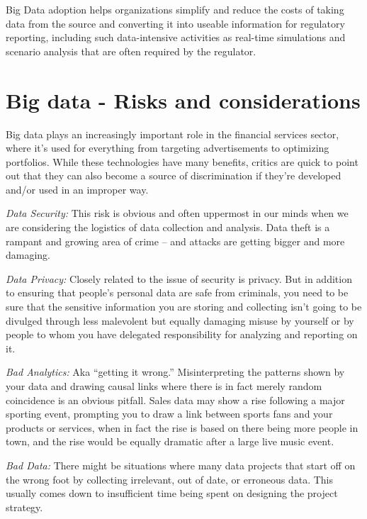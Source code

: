 \documentclass[sigconf]{acmart}
\begin{document}
Big Data adoption helps organizations
simplify and reduce the costs of taking
data from the source and converting it
into useable information for regulatory
reporting, including such data-intensive
activities as real-time simulations and
scenario analysis that are often required
by the regulator.


\section{Big data - Risks and considerations}

Big data plays an increasingly important role in the financial services sector, where it’s used for everything from targeting advertisements to optimizing portfolios. While these technologies have many benefits, critics are quick to point out that they can also become a source of discrimination if they're developed and/or used in an improper way.\cite{risk-with-bigdata}

\textit{Data Security:} This risk is obvious and often uppermost in our minds when we are considering the logistics of data collection and analysis. Data theft is a rampant and growing area of crime – and attacks are getting bigger and more damaging. \cite{5risks-bigdata}

\textit{Data Privacy:} Closely related to the issue of security is privacy. But in addition to ensuring that people’s personal data are safe from criminals, you need to be sure that the sensitive information you are storing and collecting isn’t going to be divulged through less malevolent but equally damaging misuse by yourself or by people to whom you have delegated responsibility for analyzing and reporting on it.\cite{5risks-bigdata}

\textit{Bad Analytics:} Aka “getting it wrong.” Misinterpreting the patterns shown by your data and drawing causal links where there is in fact merely random coincidence is an obvious pitfall. Sales data may show a rise following a major sporting event, prompting you to draw a link between sports fans and your products or services, when in fact the rise is based on there being more people in town, and the rise would be equally dramatic after a large live music event.\cite{5risks-bigdata}

\textit{Bad Data:} There might be situations where many data projects that start off on the wrong foot by collecting irrelevant, out of date, or erroneous data. This usually comes down to insufficient time being spent on designing the project strategy.\cite{5risks-bigdata}
\end{document}
